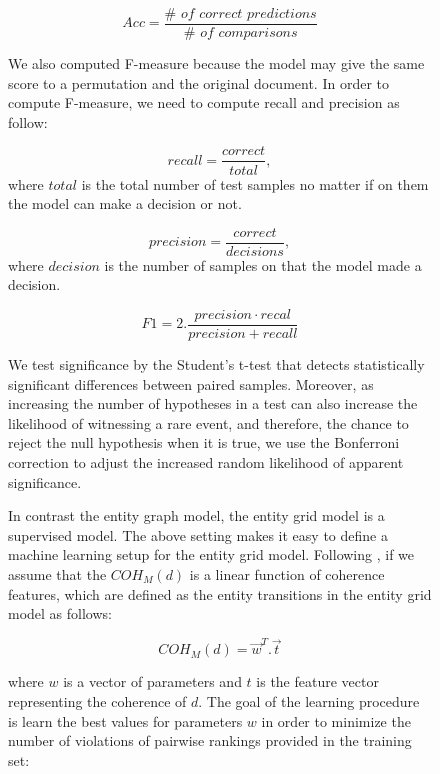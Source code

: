 \begin{figure}[!t]
\begin{equation}
Acc  = \frac{\#\textit{ of correct predictions}}{\#\textit{ of comparisons}}
\end{equation}

We also computed F-measure because the model may give the same score to a permutation and the original document. 
In order to compute F-measure, we need to compute recall and precision as follow:

\begin{equation}
recall = \frac{correct}{total},
\end{equation}
where $total$ is the total number of test samples no matter if on them the model can make a decision or not. 

\begin{equation}
precision = \frac{correct}{decisions},
\end{equation}
where $decision$ is the number of samples on that the model made a decision.

\begin{equation}
F1 = 2.\frac{precision \cdot recal}{precision + recall}
\end{equation}


We test significance by the Student’s t-test that detects statistically significant differences between paired samples.
Moreover, as increasing the number of hypotheses in a test can also increase the likelihood of witnessing a rare event, and therefore, the chance to reject the null hypothesis when it is true, we use the Bonferroni correction to adjust the increased
random likelihood of apparent significance. 

In contrast the entity graph model, the entity grid model is a supervised model. 
The above setting makes it easy to define a machine learning setup for the entity grid model. 
Following , if we assume that the $COH_M(d)$ is a linear function of coherence features, which are defined as the entity transitions in the entity grid model as follows:

\begin{equation}
COH_M(d) = \vec{w}^{T}.\vec{t}
\end{equation}

where $w$ is a vector of parameters and $t$ is the feature vector representing the coherence of $d$. 
The goal of the learning procedure is learn the best values for parameters $w$ in order to minimize the number of violations of pairwise rankings provided in the training set:


\end{figure}

